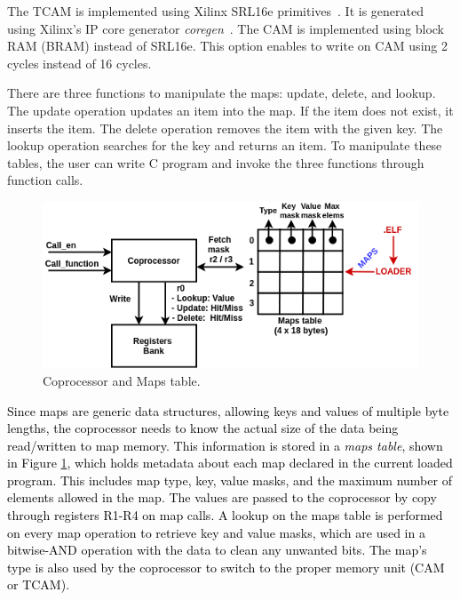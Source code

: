 The TCAM is implemented using Xilinx SRL16e primitives~\cite{xilinx_kylelocke2011}.
It is generated using Xilinx's IP core generator \textit{coregen}~\cite{xilinx_core_generator_2018}. The CAM is implemented using block RAM (BRAM) instead of SRL16e. This option enables to write on CAM using 2 cycles instead of 16 cycles.

There are three functions to manipulate the maps: update, delete, and lookup. The update operation updates an item into the map. If the item does not exist, it inserts the item. The delete operation removes the item with the given key. The lookup operation searches for the key and returns an item.
To manipulate these tables, the user can write C program and invoke the three functions through function calls.

\begin{figure}[ht]
\centering
\includegraphics[width=1.\linewidth]{figures/coprocessor.png}
\caption{Coprocessor and Maps table.}
\label{fig:coproc}
\end{figure}

\textcolor{black}{
Since maps are generic data structures, allowing keys and values of multiple byte lengths, the coprocessor needs to know the actual size of the data being read/written to map memory. This information is stored in a \textit{maps table}, shown in Figure \ref{fig:coproc}, which holds metadata about each map declared in the current loaded program. This includes map type, key, value masks, and the maximum number of elements allowed in the map. 
The values are passed to the coprocessor by copy through registers R1-R4 on map calls. A lookup on the maps table is performed on every map operation to retrieve key and value masks, which are used in a bitwise-AND operation with the data to clean any unwanted bits. The map's type is also used by the coprocessor to switch to the proper memory unit (CAM or TCAM).
}

